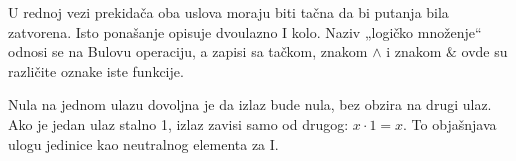 
U rednoj vezi prekidača oba uslova moraju biti tačna da bi putanja bila zatvorena. Isto ponašanje opisuje dvoulazno I kolo. Naziv „logičko množenje“ odnosi se na Bulovu operaciju, a zapisi sa tačkom, znakom \(\land\) i znakom \(\&\) ovde su različite oznake iste funkcije.

Nula na jednom ulazu dovoljna je da izlaz bude nula, bez obzira na drugi ulaz. Ako je jedan ulaz stalno 1, izlaz zavisi samo od drugog: \(x\cdot1=x\). To objašnjava ulogu jedinice kao neutralnog elementa za I.
